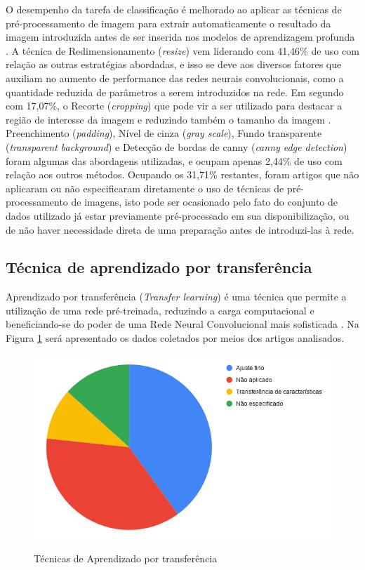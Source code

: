 \documentclass[
	12pt,				%
	oneside,			%
	a4paper,			%
	english,			%
	brazil				%
	]{abntex2ppgsi}
\begin{document}
O desempenho da tarefa de classificação é melhorado ao aplicar as técnicas de pré-processamento de imagem para extrair automaticamente o resultado da imagem introduzida antes de ser inserida nos modelos de aprendizagem profunda \cite{thenmozhi2019crop}. A técnica de Redimensionamento (\textit{resize}) vem liderando com 41,46\% de uso com relação as outras estratégias abordadas, e isso se deve aos diversos fatores que auxiliam no aumento de performance das redes neurais convolucionais, como a quantidade reduzida de parâmetros a serem introduzidos na rede. Em segundo com 17,07\%, o Recorte (\textit{cropping}) que pode vir a ser utilizado para destacar a região de interesse da imagem e reduzindo também o tamanho da imagem \cite{thenmozhi2019crop}. Preenchimento (\textit{padding}), Nível de cinza (\textit{gray scale}), Fundo transparente (\textit{transparent background}) e Detecção de bordas de canny (\textit{canny edge detection}) foram algumas das abordagens utilizadas, e ocupam apenas 2,44\% de uso com relação aos outros métodos. Ocupando os 31,71\% restantes, foram artigos que não aplicaram ou não especificaram diretamente o uso de técnicas de pré-processamento de imagens, isto pode ser ocasionado pelo fato do conjunto de dados utilizado já estar previamente pré-processado em sua disponibilização, ou de não haver necessidade direta de uma preparação antes de introduzi-las à rede.

\subsection{Técnica de aprendizado por transferência}

Aprendizado por transferência (\textit{Transfer learning}) é uma técnica que permite a utilização de uma rede pré-treinada, reduzindo a carga computacional e beneficiando-se do poder de uma Rede Neural Convolucional mais sofisticada \cite{valan2019automated}. Na Figura \ref{fig:grafico_transfer-learning_vs_uso} será apresentado os dados coletados por meios dos artigos analisados.

\begin{figure}[H]
    \centering
    \caption{Técnicas de Aprendizado por transferência}
    \includegraphics[scale=.60]{imagens/grafico_transfer-learning_vs_uso.png}
    \label{fig:grafico_transfer-learning_vs_uso}
\end{figure}
\end{document}
